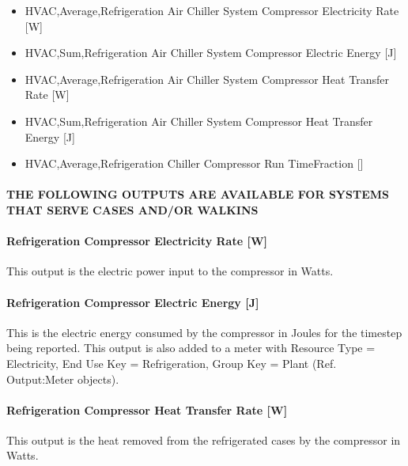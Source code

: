 \begin{itemize}
\item
  HVAC,Average,Refrigeration Air Chiller System Compressor Electricity Rate {[}W{]}
\item
  HVAC,Sum,Refrigeration Air Chiller System Compressor Electric Energy {[}J{]}
\item
  HVAC,Average,Refrigeration Air Chiller System Compressor Heat Transfer Rate {[}W{]}
\item
  HVAC,Sum,Refrigeration Air Chiller System Compressor Heat Transfer Energy {[}J{]}
\item
  HVAC,Average,Refrigeration Chiller Compressor Run TimeFraction {[]}
\end{itemize}

\paragraph{THE FOLLOWING OUTPUTS ARE AVAILABLE FOR SYSTEMS THAT SERVE CASES AND/OR WALKINS}\label{the-following-outputs-are-available-for-systems-that-serve-cases-andor-walkins-1}

\paragraph{Refrigeration Compressor Electricity Rate {[}W{]}}\label{refrigeration-compressor-electric-power-w}

This output is the electric power input to the compressor in Watts.

\paragraph{Refrigeration Compressor Electric Energy {[}J{]}}\label{refrigeration-compressor-electric-energy-j}

This is the electric energy consumed by the compressor in Joules for the timestep being reported. This output is also added to a meter with Resource Type = Electricity, End Use Key = Refrigeration, Group Key = Plant (Ref. Output:Meter objects).

\paragraph{Refrigeration Compressor Heat Transfer Rate {[}W{]}}\label{refrigeration-compressor-heat-transfer-rate-w}

This output is the heat removed from the refrigerated cases by the compressor in Watts.

